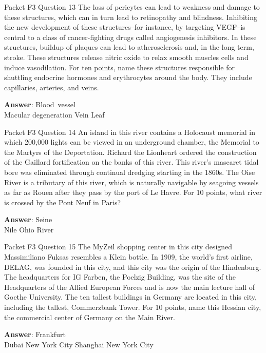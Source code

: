 \begin{frame}{Packet F3 Question 13}
The loss of pericytes can lead to weakness and damage to these structures, which can in turn lead to retinopathy and blindness. Inhibiting the new development of these structures--for instance, by targeting VEGF--is central to a class of cancer-fighting drugs called angiogenesis inhibitors. In these structures, buildup of   plaques can lead to atherosclerosis and, in the long term, stroke. These structures release nitric oxide to relax smooth   muscles cells and induce vasodilation. For ten points, name   these structures responsible for shuttling endocrine hormones and erythrocytes around the body. They include capillaries, arteries, and veins.    

\textbf{Answer}: Blood\ vessel\\
 Macular degeneration
 Vein
 Leaf
\end{frame}

\begin{frame}{Packet F3 Question 14}
An island in this river contains a Holocaust memorial in which 200,000 lights can be viewed in an underground chamber, the Memorial to the Martyrs of the Deportation. Richard the Lionheart ordered the construction of the Gaillard fortification on the banks of this river. This river’s   mascaret tidal bore     was eliminated through continual dredging starting in the   1860s. The Oise River is a tributary of this river, which is naturally navigable by seagoing vessels as far as Rouen after they pass by the port of Le Havre. For 10 points, what river is crossed by the Pont Neuf in Paris?  

\textbf{Answer}: Seine\\
 Nile
 Ohio River
\end{frame}

\begin{frame}{Packet F3 Question 15}
The MyZeil shopping center in this city designed Massimiliano Fuksas resembles a Klein bottle.  In 1909, the world's first airline, DELAG, was founded in this city, and this city was the origin of the Hindenburg.  The headquarters for IG Farben, the Poelzig Building, was the site of the Headquarters of the Allied European Forces and is now the main lecture hall of Goethe University.  The ten tallest buildings in Germany are located in this city, including the tallest, Commerzbank Tower.  For 10 points, name this Hessian city, the commercial center of Germany on the Main River.        

\textbf{Answer}: Frankfurt\\
 Dubai
 New York City
 Shanghai
 New York City
\end{frame}

